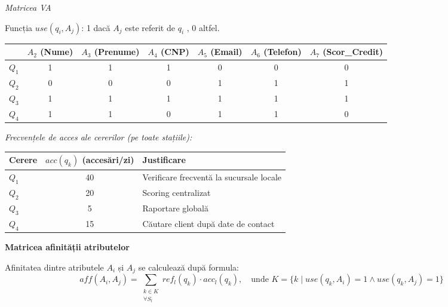 \documentclass[12pt,a4paper]{article}
\begin{document}
\textit{Matricea VA}

Funcția $use(q_i, A_j)$: 1 dacă $A_j$ este referit de $q_i$ , 0 altfel.

\begin{center}
\begin{tabular}{l|cccccc}
\toprule
 & $A_2$ (Nume) & $A_3$ (Prenume) & $A_4$ (CNP) & $A_5$ (Email) & $A_6$ (Telefon) & $A_7$ (Scor\_Credit) \\
\midrule
$Q_1$ & 1 & 1 & 1 & 0 & 0 & 0 \\
$Q_2$ & 0 & 0 & 0 & 1 & 1 & 1 \\
$Q_3$ & 1 & 1 & 1 & 1 & 1 & 1 \\
$Q_4$ & 1 & 1 & 0 & 1 & 1 & 0 \\
\bottomrule
\end{tabular}
\end{center}

\textit{Frecvențele de acces ale cererilor (pe toate stațiile):}

\begin{center}
\begin{tabular}{l|c|l}
\toprule
Cerere & $acc(q_k)$ (accesări/zi) & Justificare \\
\midrule
$Q_1$ & 40 & Verificare frecventă la sucursale locale \\
$Q_2$ & 20 & Scoring centralizat \\
$Q_3$ &  5 & Raportare globală \\
$Q_4$ & 15 & Căutare client după date de contact \\
\bottomrule
\end{tabular}
\end{center}

\textbf{Matricea afinității atributelor}

Afinitatea dintre atributele $A_i$ și $A_j$ se calculează după formula:
\[
  aff(A_i, A_j) = \sum_{\substack{k \in K \\ \forall S_l}} ref_l(q_k) \cdot acc_l(q_k),
  \quad \text{unde } K = \{k \mid use(q_k, A_i) = 1 \land use(q_k, A_j) = 1\}
\]
\end{document}
